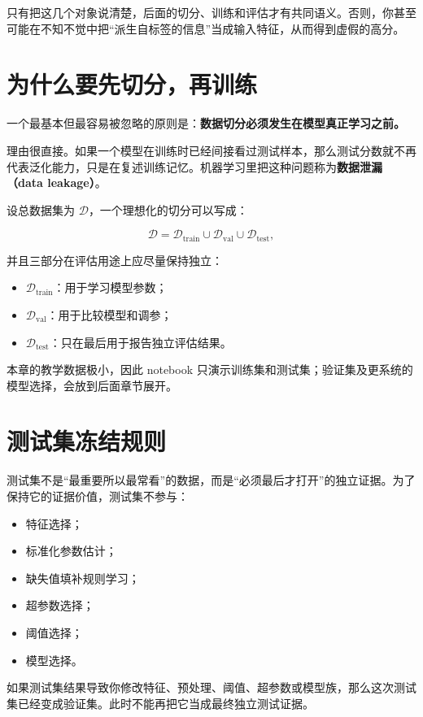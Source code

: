 只有把这几个对象说清楚，后面的切分、训练和评估才有共同语义。否则，你甚至可能在不知不觉中把“派生自标签的信息”当成输入特征，从而得到虚假的高分。

\section{为什么要先切分，再训练}

一个最基本但最容易被忽略的原则是：\textbf{数据切分必须发生在模型真正学习之前。}

理由很直接。如果一个模型在训练时已经间接看过测试样本，那么测试分数就不再代表泛化能力，只是在复述训练记忆。机器学习里把这种问题称为\textbf{数据泄漏（data leakage）}。

设总数据集为 $\mathcal{D}$，一个理想化的切分可以写成：

\[
\mathcal{D} = \mathcal{D}_{\mathrm{train}} \cup
\mathcal{D}_{\mathrm{val}} \cup
\mathcal{D}_{\mathrm{test}},
\]

并且三部分在评估用途上应尽量保持独立：

\begin{itemize}
    \item $\mathcal{D}_{\mathrm{train}}$：用于学习模型参数；
    \item $\mathcal{D}_{\mathrm{val}}$：用于比较模型和调参；
    \item $\mathcal{D}_{\mathrm{test}}$：只在最后用于报告独立评估结果。
\end{itemize}

本章的教学数据极小，因此 notebook 只演示训练集和测试集；验证集及更系统的模型选择，会放到后面章节展开。

\section{测试集冻结规则}

测试集不是“最重要所以最常看”的数据，而是“必须最后才打开”的独立证据。为了保持它的证据价值，测试集不参与：

\begin{itemize}
    \item 特征选择；
    \item 标准化参数估计；
    \item 缺失值填补规则学习；
    \item 超参数选择；
    \item 阈值选择；
    \item 模型选择。
\end{itemize}

如果测试集结果导致你修改特征、预处理、阈值、超参数或模型族，那么这次测试集已经变成验证集。此时不能再把它当成最终独立测试证据。

